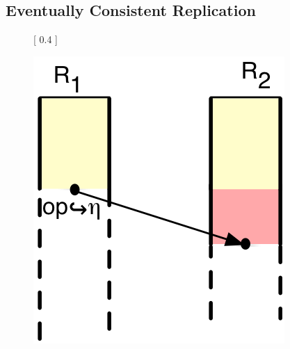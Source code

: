 
\subsection{Eventually Consistent Replication}

\begin{figure}
\centering
{} [
  0.4\columnwidth
] {
  \includegraphics[scale=0.7]{Figures/ec-theirs}
 
}
\end{figure}

